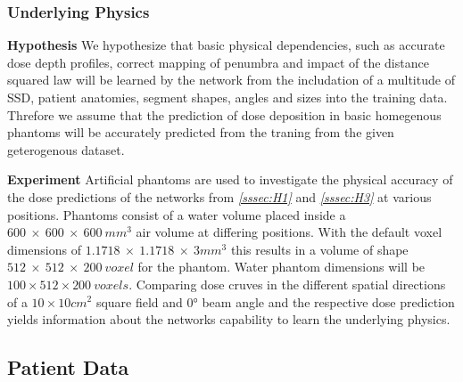 \subsubsection{Underlying Physics}\label{sssec:H4}
\begin{hanginglist}\itemsep2pt

    \item\textbf{Hypothesis}\newline
    We hypothesize that basic physical dependencies, such as accurate dose depth profiles, correct mapping of penumbra and impact of the distance squared law will be learned by the network from the includation of a multitude of \acs{SSD}, patient anatomies, segment shapes, angles and sizes into the training data.
    Threfore we assume that the prediction of dose deposition in basic homegenous phantoms will be accurately predicted from the traning from the given geterogenous dataset.\\

    \item\textbf{Experiment}\newline
    Artificial phantoms are used to investigate the physical accuracy of the dose predictions of the networks from \emph{\ref{sssec:H1} } and \emph{\ref{sssec:H3} } at various positions. Phantoms consist of a water volume placed inside a $600~\times~600~\times~600~mm^3$ air volume at differing positions. With the default voxel dimensions of $1.1718~\times~1.1718~\times~3mm^3$ this results in a volume of shape $512~\times~512~\times~200~voxel$ for the phantom. 
    Water phantom dimensions will be $100 \times 512 \times 200~voxels$.
    Comparing dose cruves in the different spatial directions of a $10 \times 10 cm^2$ square field and 0° beam angle and the respective dose prediction yields information about the networks capability to learn the underlying physics.\\

\end{hanginglist}

\subsection{Patient Data}

